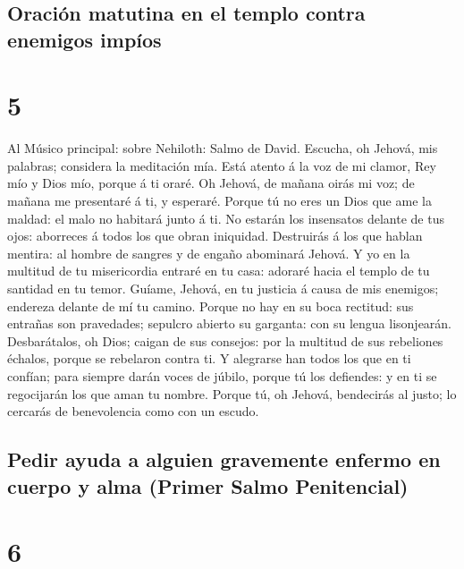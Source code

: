 \hypertarget{oraciuxf3n-matutina-en-el-templo-contra-enemigos-impuxedos}{%
\subsection{Oración matutina en el templo contra enemigos
impíos}\label{oraciuxf3n-matutina-en-el-templo-contra-enemigos-impuxedos}}

\hypertarget{section-4}{%
\section{5}\label{section-4}}

 Al Músico principal: sobre Nehiloth: Salmo de David.
Escucha, oh Jehová, mis palabras; considera la meditación mía.
 Está atento á la voz de mi clamor, Rey mío y Dios mío,
porque á ti oraré.  Oh Jehová, de mañana oirás mi voz; de
mañana me presentaré á ti, y esperaré.  Porque tú no eres
un Dios que ame la maldad: el malo no habitará junto á ti.
 No estarán los insensatos delante de tus ojos: aborreces
á todos los que obran iniquidad.  Destruirás á los que
hablan mentira: al hombre de sangres y de engaño abominará Jehová.
 Y yo en la multitud de tu misericordia entraré en tu
casa: adoraré hacia el templo de tu santidad en tu temor. 
Guíame, Jehová, en tu justicia á causa de mis enemigos; endereza delante
de mí tu camino.  Porque no hay en su boca rectitud: sus
entrañas son pravedades; sepulcro abierto su garganta: con su lengua
lisonjearán.  Desbarátalos, oh Dios; caigan de sus
consejos: por la multitud de sus rebeliones échalos, porque se rebelaron
contra ti.  Y alegrarse han todos los que en ti confían;
para siempre darán voces de júbilo, porque tú los defiendes: y en ti se
regocijarán los que aman tu nombre.  Porque tú, oh
Jehová, bendecirás al justo; lo cercarás de benevolencia como con un
escudo.

\hypertarget{pedir-ayuda-a-alguien-gravemente-enfermo-en-cuerpo-y-alma-primer-salmo-penitencial}{%
\subsection{Pedir ayuda a alguien gravemente enfermo en cuerpo y alma
(Primer Salmo
Penitencial)}\label{pedir-ayuda-a-alguien-gravemente-enfermo-en-cuerpo-y-alma-primer-salmo-penitencial}}

\hypertarget{section-5}{%
\section{6}\label{section-5}}


